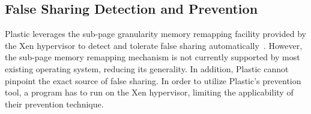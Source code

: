 \subsection{False Sharing Detection and Prevention}

Plastic leverages the sub-page granularity memory remapping facility provided by the Xen hypervisor to detect and tolerate false sharing automatically~\cite{OSdetection}. However, the sub-page memory remapping mechanism is not currently supported by most existing operating system, reducing its generality. In addition, Plastic cannot pinpoint the exact source of false sharing.  
In order to utilize Plastic's prevention tool, a program has to run on the Xen hypervisor, limiting the applicability of their prevention technique.

